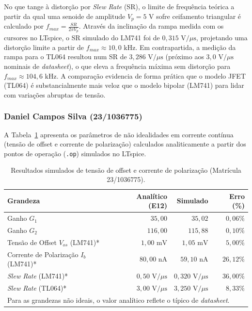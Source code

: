 \documentclass[11pt,a4paper]{article}
\begin{document}
No que tange à distorção por \textit{Slew Rate} (SR), o limite de frequência teórica a partir da qual uma senoide de amplitude $V_p = 5\text{ V}$ sofre ceifamento triangular é calculado por $f_{max} = \frac{SR}{2\pi V_p}$. Através da inclinação da rampa medida com os cursores no LTspice, o SR simulado do LM741 foi de $0{,}315\text{ V/}\mu\text{s}$, projetando uma distorção limite a partir de $f_{max} \approx 10{,}0\text{ kHz}$. Em contrapartida, a medição da rampa para o TL064 resultou num SR de $3{,}286\text{ V/}\mu\text{s}$ (próximo aos $3{,}0\text{ V/}\mu\text{s}$ nominais de \textit{datasheet}), o que eleva a frequência máxima sem distorção para $f_{max} \approx 104{,}6\text{ kHz}$. A comparação evidencia de forma prática que o modelo JFET (TL064) é substancialmente mais veloz que o modelo bipolar (LM741) para lidar com variações abruptas de tensão. 

\subsubsection{Daniel Campos Silva (23/1036775)}

A Tabela~\ref{tab:resultados_daniel} apresenta os parâmetros de não idealidades em corrente contínua (tensão de offset e corrente de polarização) calculados analiticamente a partir dos pontos de operação (\texttt{.op}) simulados no LTspice.

\begin{table}[H]
    \centering
    \caption{Resultados simulados de tensão de offset e corrente de polarização (Matrícula 23/1036775).}
    \label{tab:resultados_daniel}
    \renewcommand{\arraystretch}{1.2}
    \begin{tabular}{@{}lrrr@{}}
    \toprule
    \textbf{Grandeza} & \textbf{Analítico (E12)} & \textbf{Simulado} & \textbf{Erro (\%)} \\
    \midrule    
    Ganho $G_1$ & $35{,}00$ & $35{,}02$ & $0{,}06\%$ \\
    Ganho $G_2$ & $116{,}00$ & $115{,}88$ & $0{,}10\%$ \\
    Tensão de Offset $V_{os}$ (LM741)* & $1{,}00\text{ mV}$ & $1{,}05\text{ mV}$ & $5{,}00\%$ \\
    Corrente de Polarização $I_b$ (LM741)* & $80{,}00\text{ nA}$ & $59{,}10\text{ nA}$ & $26{,}12\%$ \\
    \textit{Slew Rate} (LM741)* & $0{,}50\text{ V/}\mu\text{s}$ & $0{,}320\text{ V/}\mu\text{s}$ & $36{,}00\%$ \\
    \textit{Slew Rate} (TL064)* & $3{,}00\text{ V/}\mu\text{s}$ & $3{,}250\text{ V/}\mu\text{s}$ & $8{,}33\%$ \\
    \bottomrule
    \multicolumn{4}{l}{\footnotesize * Para as grandezas não ideais, o valor analítico reflete o típico de \textit{datasheet}.}
    \end{tabular}
\end{table}
\end{document}
